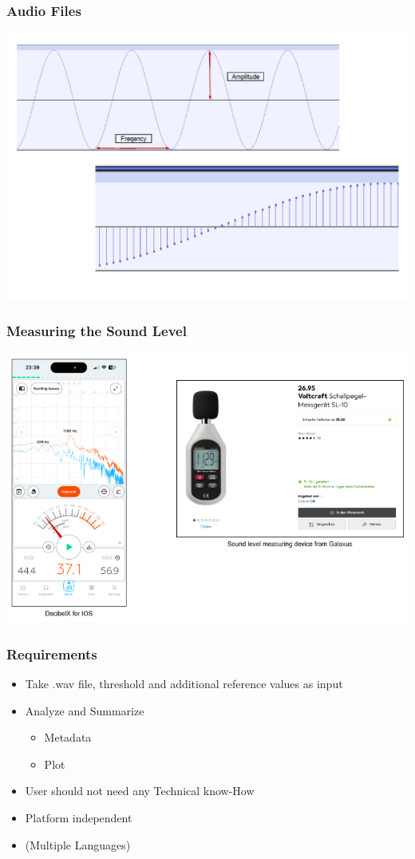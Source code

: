 \begin{frame}
    \frametitle{Audio Files}
    \centering
    \includegraphics[width=0.8\linewidth]{../assets/audiofile_description.png}
\end{frame}

\begin{frame}
    \frametitle{Measuring the Sound Level}
    \centering
    \includegraphics[width=0.6\linewidth]{../assets/measure_sound_level.png}
\end{frame}

\begin{frame}
    \frametitle{Requirements}
    \begin{itemize}[<+->]
        \large
        \item Take .wav file, threshold and additional reference values as input
        \item Analyze and Summarize 
        \begin{itemize}
            \large
            \item Metadata
            \item Plot
        \end{itemize}
        \item User should not need any Technical know-How
        \item Platform independent
        \item (Multiple Languages)
    \end{itemize}
\end{frame}

